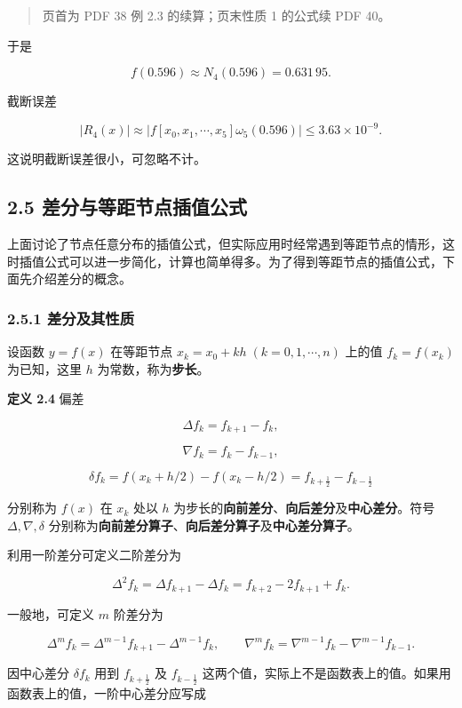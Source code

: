 \begin{quote}
页首为 PDF 38 例 2.3 的续算；页末性质 1 的公式续 PDF 40。
\end{quote}

于是

\[
f(0.596)\approx N_4(0.596)=0.631\,95.
\]

截断误差

\[
|R_4(x)|\approx|f[x_0,x_1,\cdots,x_5]\omega_5(0.596)|\le3.63\times10^{-9}.
\]

这说明截断误差很小，可忽略不计。

\subsection{2.5 差分与等距节点插值公式}\label{ch02a-ux5deeux5206ux4e0eux7b49ux8dddux8282ux70b9ux63d2ux503cux516cux5f0f}

上面讨论了节点任意分布的插值公式，但实际应用时经常遇到等距节点的情形，这时插值公式可以进一步简化，计算也简单得多。为了得到等距节点的插值公式，下面先介绍差分的概念。

\subsubsection{2.5.1 差分及其性质}\label{ch02a-ux5deeux5206ux53caux5176ux6027ux8d28}

设函数 \(y=f(x)\) 在等距节点 \(x_k=x_0+kh\;(k=0,1,\cdots,n)\) 上的值 \(f_k=f(x_k)\) 为已知，这里 \(h\) 为常数，称为\textbf{步长}。

\textbf{定义 2.4} 偏差

\[
\Delta f_k=f_{k+1}-f_k,
\tag{2.5.1}
\]

\[
\nabla f_k=f_k-f_{k-1},
\tag{2.5.2}
\]

\[
\delta f_k=f(x_k+h/2)-f(x_k-h/2)=f_{k+\frac12}-f_{k-\frac12}
\tag{2.5.3}
\]

分别称为 \(f(x)\) 在 \(x_k\) 处以 \(h\) 为步长的\textbf{向前差分}、\textbf{向后差分}及\textbf{中心差分}。符号 \(\Delta,\nabla,\delta\) 分别称为\textbf{向前差分算子}、\textbf{向后差分算子}及\textbf{中心差分算子}。

利用一阶差分可定义二阶差分为

\[
\Delta^2 f_k=\Delta f_{k+1}-\Delta f_k=f_{k+2}-2f_{k+1}+f_k.
\]

一般地，可定义 \(m\) 阶差分为

\[
\Delta^m f_k=\Delta^{m-1}f_{k+1}-\Delta^{m-1}f_k,\qquad
\nabla^m f_k=\nabla^{m-1}f_k-\nabla^{m-1}f_{k-1}.
\]

因中心差分 \(\delta f_k\) 用到 \(f_{k+\frac12}\) 及 \(f_{k-\frac12}\) 这两个值，实际上不是函数表上的值。如果用函数表上的值，一阶中心差分应写成

